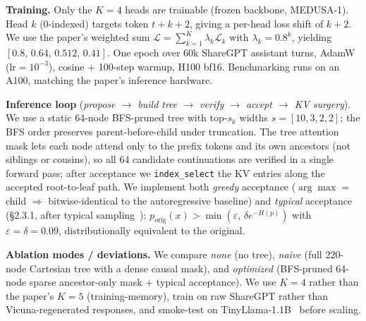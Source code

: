 \documentclass[11pt,letterpaper]{article}
\begin{document}
\textbf{Training.} Only the $K{=}4$ heads are trainable (frozen backbone, MEDUSA-1). Head $k$ (0-indexed) targets token $t{+}k{+}2$, giving a per-head loss shift of $k{+}2$. We use the paper's weighted sum $\mathcal{L}=\sum_{k=1}^{K}\lambda_k\mathcal{L}_k$ with $\lambda_k=0.8^{k}$, yielding $[0.8,\,0.64,\,0.512,\,0.41]$. One epoch over 60k ShareGPT assistant turns, AdamW ($\text{lr}=10^{-3}$), cosine + 100-step warmup, H100 bf16. Benchmarking runs on an A100, matching the paper's inference hardware.

\textbf{Inference loop} (\emph{propose $\to$ build tree $\to$ verify $\to$ accept $\to$ KV surgery}). We use a static 64-node BFS-pruned tree with top-$s_k$ widths $s=[10,3,2,2]$; the BFS order preserves parent-before-child under truncation. The tree attention mask lets each node attend only to the prefix tokens and its own ancestors (not siblings or cousins), so all 64 candidate continuations are verified in a single forward pass; after acceptance we \texttt{index\_select} the KV entries along the accepted root-to-leaf path. We implement both \emph{greedy} acceptance ($\arg\max{=}$child $\Rightarrow$ bitwise-identical to the autoregressive baseline) and \emph{typical} acceptance (\S2.3.1, after typical sampling~\cite{meister2023typical}): $p_{\text{orig}}(x) > \min(\varepsilon,\,\delta e^{-H(p)})$ with $\varepsilon{=}\delta{=}0.09$, distributionally equivalent to the original.

\textbf{Ablation modes / deviations.} We compare \emph{none} (no tree), \emph{naive} (full 220-node Cartesian tree with a dense causal mask), and \emph{optimized} (BFS-pruned 64-node sparse ancestor-only mask + typical acceptance). We use $K{=}4$ rather than the paper's $K{=}5$ (training-memory), train on raw ShareGPT rather than Vicuna-regenerated responses, and smoke-test on TinyLlama-1.1B~\cite{zhang2024tinyllama} before scaling.
\end{document}

